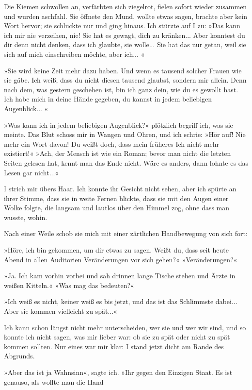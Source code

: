 Die Kiemen schwollen an, verfärbten sich ziegelrot, fielen sofort
wieder zusammen und wurden aschfahl. Sie öffnete den Mund, wollte
etwas sagen, brachte aber kein Wort hervor; sie schluckte nur und
ging hinaus. Ich stürzte auf I zu: »Das kann ich mir nie verzeihen,
nie! Sie hat es gewagt, dich zu kränken... Aber konntest du dir
denn nicht denken, dass ich glaubte, sie wolle... Sie hat das nur
getan, weil sie sich auf mich einschreiben möchte, aber ich... «

»Sie wird keine Zeit mehr dazu haben. Und wenn es tausend solcher
Frauen wie sie gäbe. Ich weiß, dass du nicht diesen tausend
glaubst, sondern mir allein. Denn nach dem, was gestern geschehen
ist, bin ich ganz dein, wie du es gewollt hast. Ich habe mich in
deine Hände gegeben, du kannst in jedem beliebigen Augenblick... «

»Was kann ich in jedem beliebigen Augenblick?« plötzlich begriff
ich, was sie meinte. Das Blut schoss mir in Wangen und Ohren, und
ich schrie: »Hör auf! Nie mehr ein Wort davon! Du weißt doch, dass
mein früheres Ich nicht mehr existiert!« »Ach, der Mensch ist wie
ein Roman; bevor man nicht die letzten Seiten gelesen hat, kennt
man das Ende nicht. Wäre es anders, dann lohnte es das Lesen gar
nicht...«

I strich mir übers Haar. Ich konnte ihr Gesicht nicht sehen, aber
ich spürte an ihrer Stimme, dass sie in weite Fernen blickte, dass
sie mit den Augen einer Wolke folgte, die langsam und lautlos über
den Himmel zog, ohne dass man wusste, wohin.

Nach einer Weile schob sie mich mit einer zärtlichen Handbewegung
von sich fort:

»Höre, ich bin gekommen, um dir etwas zu sagen. Weißt du, dass seit
heute Abend in allen Auditorien Veränderungen vor sich gehen?«
»Veränderungen?«

»Ja. Ich kam vorhin vorbei und sah drinnen lange Tische stehen und
Ärzte in weißen Kitteln.« »Was mag das bedeuten?«

»Ich weiß es nicht, keiner weiß es bis jetzt, und das ist das
Schlimmste dabei... Aber sie kommen vielleicht zu spät...«

Ich kann schon längst nicht mehr unterscheiden, wer sie und wer wir
sind, und so konnte ich nicht sagen, was mir lieber war: ob sie zu
spät oder nicht zu spät kommen sollten. Nur eines war mir klar: I
stand jetzt dicht am Rande des Abgrunds.

»Aber das ist ja Wahnsinn«, sagte ich. »Ihr gegen den Einzigen
Staat. Es ist genauso, als wollte man die Hand

